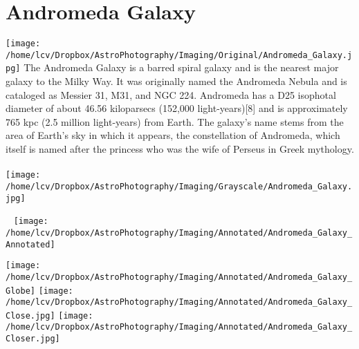 \newpage\pagecolor{black}\color{white}
\section{Andromeda Galaxy}
\texttt{[image: /home/lcv/Dropbox/AstroPhotography/Imaging/Original/Andromeda\_Galaxy.jpg]}
{\footnotesize\color{white}
The Andromeda Galaxy is a barred spiral galaxy and is the nearest major galaxy to the Milky Way. It was originally named the Andromeda Nebula and is cataloged as Messier 31, M31, and NGC 224. Andromeda has a D25 isophotal diameter of about 46.56 kiloparsecs (152,000 light-years)[8] and is approximately 765 kpc (2.5 million light-years) from Earth. The galaxy's name stems from the area of Earth's sky in which it appears, the constellation of Andromeda, which itself is named after the princess who was the wife of Perseus in Greek mythology. 
}\ \\
\texttt{[image: /home/lcv/Dropbox/AstroPhotography/Imaging/Grayscale/Andromeda\_Galaxy.jpg]}
\begin{center}
 \ \newpage
\texttt{[image: /home/lcv/Dropbox/AstroPhotography/Imaging/Annotated/Andromeda\_Galaxy\_Annotated]}

\texttt{[image: /home/lcv/Dropbox/AstroPhotography/Imaging/Annotated/Andromeda\_Galaxy\_Globe]}
\texttt{[image: /home/lcv/Dropbox/AstroPhotography/Imaging/Annotated/Andromeda\_Galaxy\_Close.jpg]}
\texttt{[image: /home/lcv/Dropbox/AstroPhotography/Imaging/Annotated/Andromeda\_Galaxy\_Closer.jpg]}
\end{center}
